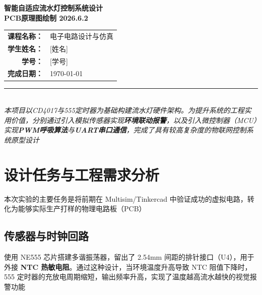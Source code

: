 \documentclass[12pt, a4paper]{article}
\begin{document}
\begin{titlepage}
    \begin{center}
        \vspace*{2cm}
        \Huge{\textbf{智能自适应流水灯控制系统设计}}\\
        \vspace{0.5cm}
        \Large{\textbf{PCB原理图绘制 2026.6.2}}\\
        \vspace{2cm}
        
        \large
        \begin{tabular}{rl}
            \textbf{课程名称：} & 电子电路设计与仿真 \\
            \textbf{学生姓名：} & [姓名] \\  %
            \textbf{学号：} & [学号] \\      %
            \textbf{完成日期：} & \today \\
        \end{tabular}
        \vspace{3cm}
        
        \rule{0.8\textwidth}{0.5pt} \\
        \vspace{0.5cm}
        \textit{本项目以CD4017与555定时器为基础构建流水灯硬件架构。为提升系统的工程实用价值，分别通过引入模拟传感器实现\textbf{环境联动报警}，以及引入微控制器（MCU）实现\textbf{PWM呼吸算法}与\textbf{UART串口通信}，完成了具有较高复杂度的物联网控制系统原型设计}
    \end{center}
\end{titlepage}

\newpage
\tableofcontents %
\newpage

\section{设计任务与工程需求分析}
本次实验的主要任务是将前期在 Multisim/Tinkercad 中验证成功的虚拟电路，转化为能够实际生产打样的物理电路板（PCB）



\subsection{传感器与时钟回路}
使用 NE555 芯片搭建多谐振荡器，留出了 2.54mm 间距的排针接口（U4），用于外接 \textbf{NTC 热敏电阻}。通过这种设计，当环境温度升高导致 NTC 阻值下降时，555 定时器的充放电周期缩短，输出频率升高，实现了温度越高流水越快的视觉报警功能
\end{document}
